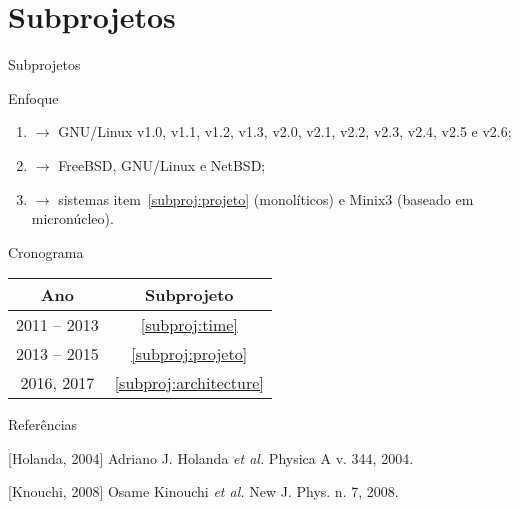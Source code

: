 \documentclass[ignorenonframetext]{beamer}
\begin{document}
\section{Subprojetos}
\label{sec:subprojs}

\begin{frame}{Subprojetos}
\begin{block}{Enfoque}
\begin{enumerate}
\item \time\label{subproj:time} $\rightarrow$ GNU/Linux v1.0, v1.1,
v1.2, v1.3, v2.0, v2.1, v2.2, v2.3, v2.4, v2.5 e v2.6;
\item \projeto\label{subproj:projeto} $\rightarrow$ FreeBSD, GNU/Linux
e NetBSD;
\item \arquitetura\label{subproj:architecture} $\rightarrow$ sistemas
item~\ref{subproj:projeto} (monolíticos) e Minix3 (baseado em micronúcleo).
\end{enumerate}
\end{block}

\begin{block}{Cronograma}
\begin{center}
\begin{tabular}[h]{cc}\hline\hline
{\bf Ano} & {\bf Subprojeto} \\\hline
2011 -- 2013  & \ref{subproj:time} \\
2013 -- 2015 & \ref{subproj:projeto}\\
2016, 2017   & \ref{subproj:architecture}\\\hline\hline
\end{tabular}
\end{center}
\end{block}
\end{frame}

\begin{frame}{Referências}
\begin{thebibliography}{4}

[Holanda, 2004]
Adriano J. Holanda {\em et al.}
\newblock Physica A v. 344, 2004.

[Knouchi, 2008]
Osame Kinouchi {\em et al.}
\newblock New J. Phys. n. 7, 2008.
\end{thebibliography}
\end{frame}
\end{document}
